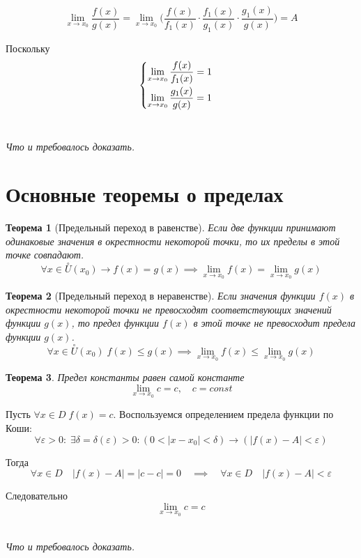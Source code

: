 \documentclass[a4paper,12pt,oneside]{extbook}
\newcommand{\newpar}{$ $\par\nobreak\ignorespaces}
\theoremstyle{numbered}
\theoremstyle{unnumbered}
\theoremstyle{named}
\newtheorem{theorem}{Теорема}[section]
\theoremstyle{unnumbered}
\theoremstyle{named}
\theoremstyle{named}
\theoremstyle{named}
\renewenvironment{proof}[1][]{\breakenv[Доказательство]{\if\relax\detokenize{#1}\relax\else\;\fi}{\textbf{#1}}}{\smallskip\newpar \hfill\textit{Что и требовалось доказать.}}
\begin{document}
\begin{proof}
    \[
        \lim_{x \to x_0}{\dfrac{f(x)}{g(x)}} = \lim_{x \to x_0}{\Big(\dfrac{f(x)}{f_1(x)} \cdot \dfrac{f_1(x)}{g_1(x)} \cdot \dfrac{g_1(x)}{g(x)}\Big)} = A
    \]

    Поскольку
    \[
        \begin{cases}
            \smallskip
            \displaystyle \lim_{x \to x_0}{\frac{f(x)}{f_1(x)}} = 1 \\
            \displaystyle \lim_{x \to x_0}{\frac{g_1(x)}{g(x)}} = 1
        \end{cases}
    \]
\end{proof}

\section{Основные теоремы о пределах}%
\label{sec:Основные теоремы о пределах}

\begin{theorem}[Предельный переход в равенстве]
    Если две функции принимают одинаковые значения в окрестности некоторой точки, то их пределы в этой точке совпадают.
    \[
        \forall x \in \overset{\circ}{U}(x_0) \rightarrow f(x) = g(x) \implies \lim_{x \to x_0}{f(x)} = \lim_{x \to x_0}{g(x)}
    \]
\end{theorem}

\begin{theorem}[Предельный переход в неравенстве]
    Если значения функции \(f(x)\) в окрестности некоторой точки не превосходят соответствующих значений функции \(g(x)\), то предел функции \(f(x)\) в этой точке не превосходит предела функции \(g(x)\).
    \[
        \forall x \in \overset{\circ}{U}(x_0) \; f(x) \leq g(x) \implies \lim_{x \to x_0}{f(x)} \leq \lim_{x \to x_0}{g(x)}
    \]
\end{theorem}

\begin{theorem}
    Предел константы равен самой константе
    \[
        \lim_{x \to x_0}{c} = c, \quad c = const
    \]
\end{theorem}

\begin{proof}
    Пусть \(\forall x \in D \; f(x) = c\).
    Воспользуемся определением предела функции по Коши:
    \[
        \forall \varepsilon > 0: \; \exists \delta = \delta(\varepsilon) > 0: (0 < |x - x_0| < \delta) \rightarrow (|f(x) - A| < \varepsilon)
    \]

    Тогда
    \[
        \forall x \in D \quad |f(x) - A| = |c - c| = 0 \quad \implies \quad \forall x \in D \quad |f(x) - A | < \varepsilon
    \]

    Следовательно
    \[
        \lim_{x \to x_0}{c} = c
    \]
\end{proof}
\end{document}
